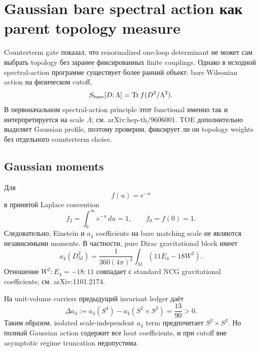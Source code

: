 \chapter{Gaussian bare spectral action как parent topology measure}

Counterterm gate показал, что renormalized one-loop determinant не может
сам выбрать topology без заранее фиксированных finite couplings. Однако в
исходной spectral-action программе существует более ранний объект: bare
Wilsonian action на физическом cutoff,
\begin{equation}
 S_{\rm bare}[D;\Lambda]
 =\operatorname{Tr} f(D^2/\Lambda^2).
 \label{eq:gaussian-bare-spectral-action}
\end{equation}
В первоначальном spectral-action principle этот functional именно так и
интерпретируется на scale \(\Lambda\); см. arXiv:hep-th/9606001. TOE
дополнительно выделяет Gaussian profile, поэтому проверим, фиксирует ли он
topology weights без отдельного counterterm choice.

\section{Gaussian moments}

Для
\begin{equation}
 f(u)=e^{-u}
\end{equation}
в принятой Laplace convention
\begin{equation}
 f_2=\int_0^\infty e^{-u}\,du=1,
 \qquad
 f_0=f(0)=1.
\end{equation}
Следовательно, Einstein и \(a_4\) coefficients на bare matching scale не
являются независимыми moments. В частности, pure Dirac gravitational block
имеет
\begin{equation}
 a_4(D_M^2)
 =\frac1{360(4\pi)^2}
 \int_M\left(11E_4-18W^2\right).
 \label{eq:dirac-a4-ew-ledger}
\end{equation}
Отношение \(W^2:E_4=-18:11\) совпадает с standard NCG gravitational
coefficients; см. arXiv:1101.2174.

На unit-volume carriers предыдущий invariant ledger даёт
\begin{equation}
 \Delta a_4
 :=a_4(S^4)-a_4(S^2\times S^2)
 =\frac{13}{90}>0.
 \label{eq:dirac-a4-carrier-difference}
\end{equation}
Таким образом, isolated scale-independent \(a_4\) term предпочитает
\(S^2\times S^2\). Но полный Gaussian action содержит все heat coefficients,
и при cutoff вне asymptotic regime truncation недопустима.


